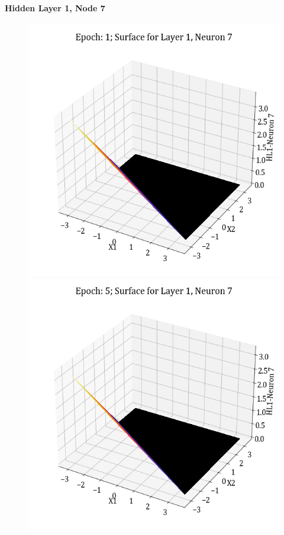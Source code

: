 \documentclass[11pt,a4paper]{article}
\begin{document}
\paragraph{Hidden Layer 1, Node 7}
\begin{figure}[H]
    \centering
    \includegraphics[scale=0.4]{images/1B_MLFFNN_E1_HL1_N7.png}
    \includegraphics[scale=0.4]{images/1B_MLFFNN_E5_HL1_N7.png}

\end{figure}
\end{document}
